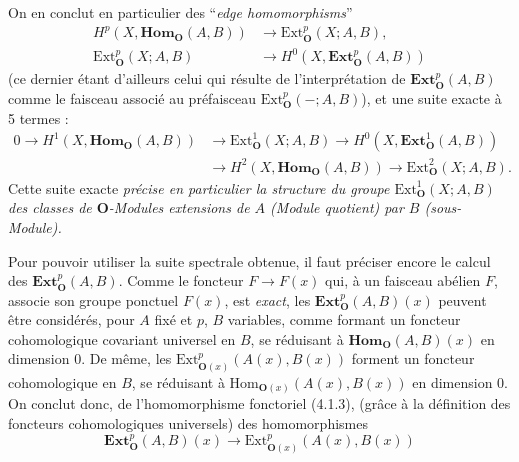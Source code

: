 On en conclut en particulier des ``\textit{edge homomorphisms}''
\[
\tag{4.2.6}
\begin{aligned}
H^p(X,\mathbf{Hom}_{\mathbf O}(A,B))&\to
  \mathrm{Ext}_{\mathbf O}^p(X;A,B),\\
\mathrm{Ext}_{\mathbf O}^p(X;A,B)&\to
  H^0(X,\mathbf{Ext}_{\mathbf O}^p(A,B))
\end{aligned}
\]
(ce dernier étant d'ailleurs celui qui résulte de l'interprétation de
$\mathbf{Ext}_{\mathbf O}^p(A,B)$ comme le faisceau associé au préfaisceau
$\mathrm{Ext}_{\mathbf O}^p(-;A,B)$), et une suite exacte à 5 termes :
\[
\tag{4.2.7}
\begin{aligned}
0\to H^1(X,\mathbf{Hom}_{\mathbf O}(A,B))
&\to \mathrm{Ext}_{\mathbf O}^1(X;A,B)
\to H^0(X,\mathbf{Ext}_{\mathbf O}^1(A,B))\\
&\to H^2(X,\mathbf{Hom}_{\mathbf O}(A,B))
\to \mathrm{Ext}_{\mathbf O}^2(X;A,B).
\end{aligned}
\]
Cette suite exacte \textit{précise en particulier la structure du groupe
$\mathrm{Ext}_{\mathbf O}^1(X;A,B)$ des classes de ${\mathbf O}$-Modules extensions de $A$
\textup{(Module quotient)} par $B$ \textup{(sous-Module).}}

Pour pouvoir utiliser la suite spectrale obtenue, il faut préciser encore le
calcul des $\mathbf{Ext}_{\mathbf O}^p(A,B)$. Comme le foncteur $F\to F(x)$ qui,
à un faisceau abélien $F$, associe son groupe ponctuel $F(x)$, est \textit{exact}, les
$\mathbf{Ext}_{\mathbf O}^p(A,B)(x)$ peuvent être considérés, pour $A$ fixé et $p$, $B$
variables, comme formant un foncteur cohomologique covariant universel en $B$,
se réduisant à $\mathbf{Hom}_{\mathbf O}(A,B)(x)$ en dimension 0. De même, les
$\mathrm{Ext}_{{\mathbf O}(x)}^p(A(x),B(x))$ forment un foncteur cohomologique en $B$,
se réduisant à $\mathrm{Hom}_{{\mathbf O}(x)}(A(x),B(x))$ en dimension 0. On conclut
donc, de l'homomorphisme fonctoriel (4.1.3), (grâce à la définition des
foncteurs cohomologiques universels) des homomorphismes
\[
\tag{4.2.8}
\mathbf{Ext}_{\mathbf O}^p(A,B)(x)\to
\mathrm{Ext}_{{\mathbf O}(x)}^p(A(x),B(x))
\]


